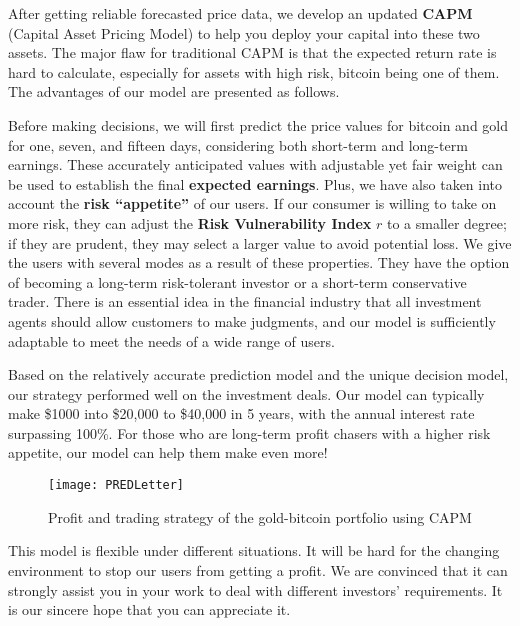 \documentclass{mcmthesis}
\begin{document}
	After getting reliable forecasted price data, we develop an updated \textbf{CAPM} (Capital Asset Pricing Model) to help you deploy your capital into these two assets. The major flaw for traditional CAPM is that the expected return rate is hard to calculate, especially for assets with high risk, bitcoin being one of them. The advantages of our model are presented as follows. 
	
	Before making decisions, we will first predict the price values for bitcoin and gold for one, seven, and fifteen days, considering both short-term and long-term earnings. These accurately anticipated values with adjustable yet fair weight can be used to establish the final \textbf{expected earnings}. Plus, we have also taken into account the \textbf{risk ``appetite''} of our users. If our consumer is willing to take on more risk, they can adjust the \textbf{Risk Vulnerability Index} \textbf{$r$} to a smaller degree; if they are prudent, they may select a larger value to avoid potential loss. We give the users with several modes as a result of these properties. They have the option of becoming a long-term risk-tolerant investor or a short-term conservative trader. There is an essential idea in the financial industry that all investment agents should allow customers to make judgments, and our model is sufficiently adaptable to meet the needs of a wide range of users. 
	
	Based on the relatively accurate prediction model and the unique decision model, our strategy performed well on the investment deals. Our model can typically make \$1000 into \$20,000 to \$40,000 in 5 years, with the annual interest rate surpassing 100\%. For those who are long-term profit chasers with a higher risk appetite, our model can help them make even more! 
	
	\begin{figure}[h]
		\centering \texttt{[image: PREDLetter]}
		\caption{Profit and trading strategy of the gold-bitcoin portfolio using CAPM}
	\end{figure}
	
	This model is flexible under different situations. It will be hard for the changing environment to stop our users from getting a profit. We are convinced that it can strongly assist you in your work to deal with different investors' requirements. It is our sincere hope that you can appreciate it. \\[12pt]
	
	
	
	\newpage
	
	
	\newpage
	
\end{document}
